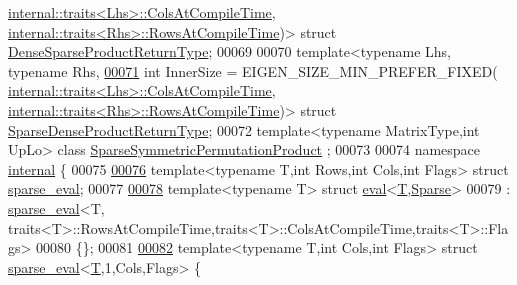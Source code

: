 \begin{DoxyCode}
      \hyperlink{struct_eigen_1_1internal_1_1traits}{internal::traits<Lhs>::ColsAtCompileTime},
      \hyperlink{struct_eigen_1_1internal_1_1traits}{internal::traits<Rhs>::RowsAtCompileTime})> \textcolor{keyword}{struct }
      \hyperlink{struct_eigen_1_1_dense_sparse_product_return_type}{DenseSparseProductReturnType};
00069          
00070 \textcolor{keyword}{template}<\textcolor{keyword}{typename} Lhs, \textcolor{keyword}{typename} Rhs,
\hyperlink{struct_eigen_1_1_sparse_dense_product_return_type}{00071}          \textcolor{keywordtype}{int} InnerSize = EIGEN\_SIZE\_MIN\_PREFER\_FIXED(
      \hyperlink{struct_eigen_1_1internal_1_1traits}{internal::traits<Lhs>::ColsAtCompileTime},
      \hyperlink{struct_eigen_1_1internal_1_1traits}{internal::traits<Rhs>::RowsAtCompileTime})> \textcolor{keyword}{struct }
      \hyperlink{struct_eigen_1_1_sparse_dense_product_return_type}{SparseDenseProductReturnType};
00072 \textcolor{keyword}{template}<\textcolor{keyword}{typename} MatrixType,\textcolor{keywordtype}{int} UpLo> \textcolor{keyword}{class }\hyperlink{class_eigen_1_1_sparse_symmetric_permutation_product}{SparseSymmetricPermutationProduct}
      ;
00073 
00074 \textcolor{keyword}{namespace }\hyperlink{namespaceinternal}{internal} \{
00075 
\hyperlink{struct_eigen_1_1internal_1_1sparse__eval}{00076} \textcolor{keyword}{template}<\textcolor{keyword}{typename} T,\textcolor{keywordtype}{int} Rows,\textcolor{keywordtype}{int} Cols,\textcolor{keywordtype}{int} Flags> \textcolor{keyword}{struct }\hyperlink{struct_eigen_1_1internal_1_1sparse__eval}{sparse\_eval};
00077 
\hyperlink{struct_eigen_1_1internal_1_1eval_3_01_t_00_01_sparse_01_4}{00078} \textcolor{keyword}{template}<\textcolor{keyword}{typename} T> \textcolor{keyword}{struct }\hyperlink{struct_eigen_1_1internal_1_1eval}{eval}<\hyperlink{group___sparse_core___module}{T},\hyperlink{struct_eigen_1_1_sparse}{Sparse}>
00079   : \hyperlink{struct_eigen_1_1internal_1_1sparse__eval}{sparse\_eval}<T, traits<T>::RowsAtCompileTime,traits<T>::ColsAtCompileTime,traits<T>::Flags>
00080 \{\};
00081 
\hyperlink{struct_eigen_1_1internal_1_1sparse__eval_3_01_t_00_011_00_01_cols_00_01_flags_01_4}{00082} \textcolor{keyword}{template}<\textcolor{keyword}{typename} T,\textcolor{keywordtype}{int} Cols,\textcolor{keywordtype}{int} Flags> \textcolor{keyword}{struct }\hyperlink{struct_eigen_1_1internal_1_1sparse__eval}{sparse\_eval}<\hyperlink{group___sparse_core___module}{T},1,Cols,Flags> \{

\end{DoxyCode}
